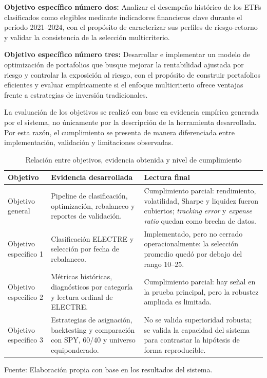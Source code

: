 \documentclass[12pt,letterpaper]{article}
\newcommand{\fuente}[1]{\begin{center}\small Fuente: #1\end{center}}
\begin{document}
\textbf{Objetivo específico número dos:} Analizar el desempeño histórico de los ETFs clasificados como elegibles mediante indicadores financieros clave durante el período 2021--2024, con el propósito de caracterizar sus perfiles de riesgo-retorno y validar la consistencia de la selección multicriterio.

\textbf{Objetivo específico número tres:} Desarrollar e implementar un modelo de optimización de portafolios que busque mejorar la rentabilidad ajustada por riesgo y controlar la exposición al riesgo, con el propósito de construir portafolios eficientes y evaluar empíricamente si el enfoque multicriterio ofrece ventajas frente a estrategias de inversión tradicionales.

La evaluación de los objetivos se realizó con base en evidencia empírica generada por el sistema, no únicamente por la descripción de la herramienta desarrollada. Por esta razón, el cumplimiento se presenta de manera diferenciada entre implementación, validación y limitaciones observadas.

\begin{table}[H]
\centering
\caption{Relación entre objetivos, evidencia obtenida y nivel de cumplimiento}
\label{tab:objetivos_evidencia}
\begin{tabular}{p{3.3cm}p{5.2cm}p{5.2cm}}
\toprule
\textbf{Objetivo} & \textbf{Evidencia desarrollada} & \textbf{Lectura final} \\
\midrule
Objetivo general & Pipeline de clasificación, optimización, rebalanceo y reportes de validación. & Cumplimiento parcial: rendimiento, volatilidad, Sharpe y liquidez fueron cubiertos; \textit{tracking error} y \textit{expense ratio} quedan como brecha de datos. \\
Objetivo específico 1 & Clasificación ELECTRE y selección por fecha de rebalanceo. & Implementado, pero no cerrado operacionalmente: la selección promedio quedó por debajo del rango 10--25. \\
Objetivo específico 2 & Métricas históricas, diagnósticos por categoría y lectura ordinal de ELECTRE. & Cumplimiento parcial: hay señal en la prueba principal, pero la robustez ampliada es limitada. \\
Objetivo específico 3 & Estrategias de asignación, backtesting y comparación con SPY, 60/40 y universo equiponderado. & No se valida superioridad robusta; se valida la capacidad del sistema para contrastar la hipótesis de forma reproducible. \\
\bottomrule
\end{tabular}
\end{table}
\fuente{Elaboración propia con base en los resultados del sistema.}
\end{document}
